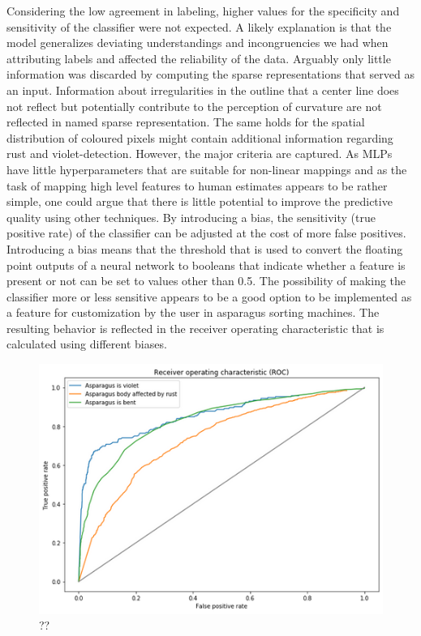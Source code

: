 Considering the low agreement in labeling, higher values for the specificity and sensitivity of the classifier were not expected. A likely explanation is that the model generalizes deviating understandings and incongruencies we had when attributing labels and affected the reliability of the data. Arguably only little information was discarded by computing the sparse representations that served as an input. Information about irregularities in the outline that a center line does not reflect but potentially contribute to the perception of curvature are not reflected in named sparse representation. The same holds for the spatial distribution of coloured pixels might contain additional information regarding rust and violet-detection. However, the major criteria are captured. As MLPs have little hyperparameters that are suitable for non-linear mappings and  as the task of mapping high level features to human estimates appears to be rather simple, one could argue that there is little potential to improve the predictive quality using other techniques. By introducing a bias, the sensitivity (true positive rate) of the classifier can be adjusted at the cost of more false positives. Introducing a bias means that the threshold that is used to convert the floating point outputs of a neural network to booleans that indicate whether a feature is present or not can be set to values other than 0.5. The possibility of making the classifier more or less sensitive appears to be a good option to be implemented as a feature for customization by the user in asparagus sorting machines. The resulting behavior is reflected in the receiver operating characteristic that is calculated using different biases.

\begin{figure}[h]
	\centering
	\includegraphics[scale=0.6]{Figures/chapter04/fe_roc}
	\decoRule
	\caption[??]{??}
	\label{fig:FeatureEngineeringROC}
\end{figure}



